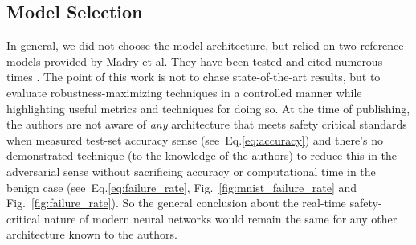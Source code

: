 \documentclass[journal]{IEEEtran}
\begin{document}
\subsection{Model Selection}
In general, we did not choose the model architecture, but relied on two reference models provided by Madry et al. They have been tested and cited numerous times \cite{madry2017towards}. The point of this work is not to chase state-of-the-art results, but to evaluate robustness-maximizing techniques in a controlled manner while highlighting useful metrics and techniques for doing so. At the time of publishing, the authors are not aware of \textit{any} architecture that meets safety critical standards when measured test-set accuracy sense (see~Eq.\ref{eq:accuracy}) and there's no demonstrated technique (to the knowledge of the authors) to reduce this in the adversarial sense without sacrificing accuracy or computational time in the benign case (see~Eq.\ref{eq:failure_rate}, Fig.~\ref{fig:mnist_failure_rate} and Fig.~\ref{fig:failure_rate}). So the general conclusion about the real-time safety-critical nature of modern neural networks would remain the same for any other architecture known to the authors.
\end{document}
